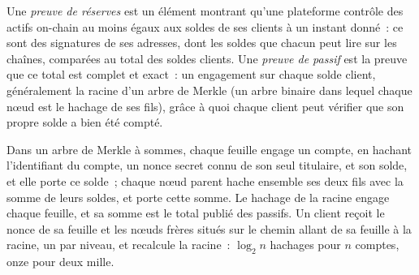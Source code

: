 \begin{definition}\label{def:m3:centralised-exchanges:por}
Une \emph{preuve de réserves} est un élément montrant qu'une plateforme contrôle des actifs on-chain
au moins égaux aux soldes de ses clients à un instant donné~: ce sont des signatures de ses adresses, dont les soldes
que chacun peut lire sur les chaînes, comparées au total des soldes clients. Une \emph{preuve de
passif} est la preuve que ce total est complet et exact~: un engagement sur chaque solde client,
généralement la racine d'un arbre de Merkle (un arbre binaire dans lequel chaque nœud
est le hachage de ses fils), grâce à quoi chaque client peut vérifier que son propre solde a bien été compté.
\end{definition}

Dans un arbre de Merkle à sommes, chaque feuille engage un compte, en hachant l'identifiant du compte, un nonce secret
connu de son seul titulaire, et son solde, et elle porte ce solde~; chaque nœud parent hache ensemble ses deux fils
avec la somme de leurs soldes, et porte cette somme. Le hachage de la racine engage chaque feuille, et sa somme est
le total publié des passifs. Un client reçoit le nonce de sa feuille et les nœuds frères situés sur le chemin
allant de sa feuille à la racine, un par niveau, et recalcule la racine~: $\log_2 n$ hachages pour $n$ comptes, onze
pour deux mille.

